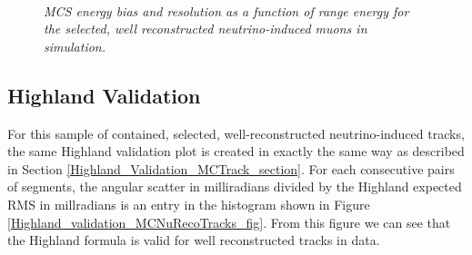 \begin{figure}
\centering
\mbox{
	\quad
	}
\caption{\textit{MCS energy bias and resolution as a function of range energy for the selected, well reconstructed neutrino-induced muons in {\ub} simulation.}}
\label{MCS_range_bias_resolution_MCNuRecoTrack_fig}
\end{figure}



\subsection{Highland Validation}\label{Highland_Validation_MCNuRecoTrack_section}
For this sample of contained, selected, well-reconstructed neutrino-induced tracks, the same Highland validation plot is created in exactly the same way as described in Section \ref{Highland_Validation_MCTrack_section}. For each consecutive pairs of segments, the angular scatter in milliradians divided by the Highland expected RMS in millradians is an entry in the histogram shown in Figure \ref{Highland_validation_MCNuRecoTracks_fig}. From this figure we can see that the Highland formula is valid for well reconstructed tracks in data.

